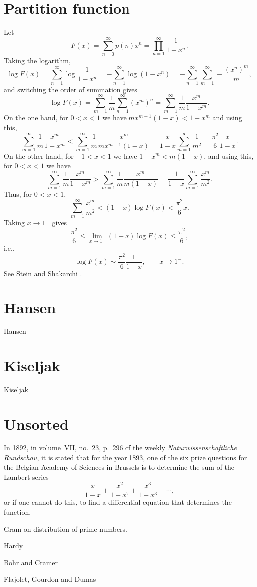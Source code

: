 \documentclass{article}
\begin{document}
\section{Partition function}
Let 
\[
F(x)=\sum_{n=0}^\infty p(n) x^n = \prod_{n=1}^\infty \frac{1}{1-x^n}.
\]
Taking the logarithm,
\[
\log F(x)=\sum_{n=1}^\infty \log \frac{1}{1-x^n}
=-\sum_{n=1}^\infty \log(1-x^n)
=-\sum_{n=1}^\infty \sum_{m=1}^\infty -\frac{(x^n)^m}{m},
\]
and switching the order of summation gives
\[
\log F(x)
=\sum_{m=1}^\infty \frac{1}{m} \sum_{n=1}^\infty (x^m)^n
=\sum_{m=1}^\infty \frac{1}{m} \frac{x^m}{1-x^m}.
\]
On the one hand, for $0<x<1$ we have $mx^{m-1}(1-x)<1-x^m$ and using this,
\[
\sum_{m=1}^\infty \frac{1}{m} \frac{x^m}{1-x^m}<\sum_{m=1}^\infty \frac{1}{m} \frac{x^m}{mx^{m-1}(1-x)}
=\frac{x}{1-x} \sum_{m=1}^\infty \frac{1}{m^2}=\frac{\pi^2}{6} \frac{x}{1-x}.
\]
On the other hand, for $-1<x<1$ we have $1-x^m<m(1-x)$, and using this, for $0<x<1$ we have
\[
\sum_{m=1}^\infty \frac{1}{m} \frac{x^m}{1-x^m}
>\sum_{m=1}^\infty \frac{1}{m} \frac{x^m}{m(1-x)}
=\frac{1}{1-x} \sum_{m=1}^\infty \frac{x^m}{m^2}.
\]
Thus, for $0<x<1$,
\[
\sum_{m=1}^\infty \frac{x^m}{m^2} < (1-x) \log F(x) < \frac{\pi^2}{6}x.
\]
Taking $x \to 1^{-}$ gives
\[
\frac{\pi^2}{6} \leq \lim_{x \to 1^-} (1-x)\log F(x) \leq \frac{\pi^2}{6},
\]
i.e.,
\[
\log F(x) \sim \frac{\pi^2}{6} \frac{1}{1-x}, \qquad x \to 1^-.
\]
See Stein and Shakarchi \cite[p.~311]{steinII}.



\section{Hansen}
Hansen \cite{hansen}


\section{Kiseljak}
Kiseljak \cite{kiseljak}



\section{Unsorted}
In 1892, in volume~VII, no.~23, 
p.~296 of the weekly {\em Naturwissenschaftliche Rundschau}, it is stated that for the year 1893, one of the six prize questions
for the 
Belgian Academy of Sciences in Brussels
 is
to determine the sum of the Lambert series
\[
\frac{x}{1-x}+\frac{x^2}{1-x^2}+\frac{x^3}{1-x^3}+\cdots,
\]
or if one cannot do this, to find a differential equation that determines the function.

Gram \cite{gram} on distribution of prime numbers.

Hardy \cite{divergent}

Bohr and Cramer \cite[p.~820]{bohr}

Flajolet, Gourdon and Dumas \cite{flajolet}




\end{document}
